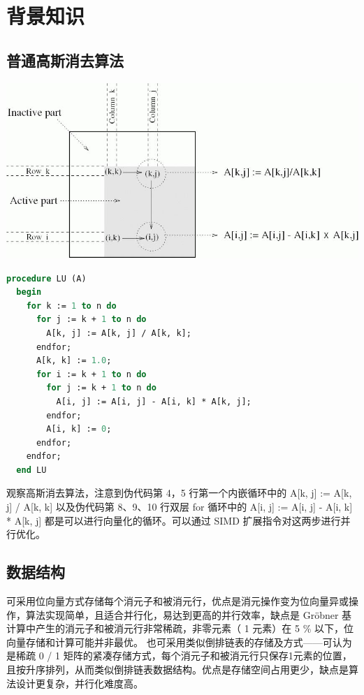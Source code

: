 \documentclass[a4paper]{article}
\begin{document}
\section{背景知识}

\subsection{普通高斯消去算法}

\includegraphics[width=\textwidth]{gauss-alg.jpg}

\begin{lstlisting}[title=普通高斯消去算法,frame=trbl,language={Pascal}]
  procedure LU (A)
  begin
    for k := 1 to n do
      for j := k + 1 to n do
        A[k, j] := A[k, j] / A[k, k];
      endfor;
      A[k, k] := 1.0;
      for i := k + 1 to n do
        for j := k + 1 to n do
          A[i, j] := A[i, j] - A[i, k] * A[k, j];
        endfor;
        A[i, k] := 0;
      endfor;
    endfor;
  end LU
\end{lstlisting}

观察高斯消去算法，注意到伪代码第 4，5 行第一个内嵌循环中的
A[k, j] := A[k, j] / A[k, k] 以及伪代码第 8、9、10 行双层 for 循环中的
A[i, j] := A[i, j] - A[i, k] * A[k, j] 都是可以进行向量化的循环。可以通过
SIMD 扩展指令对这两步进行并行优化。

\subsection{数据结构}

可采用位向量方式存储每个消元子和被消元行，优点是消元操作变为位向量异或操作，算法实现简单，且适合并行化，易达到更高的并行效率，缺点是 Gröbner 基计算中产生的消元子和被消元行非常稀疏，非零元素（ 1 元素）在 5 \% 以下，位向量存储和计算可能并非最优。
也可采用类似倒排链表的存储及方式——可认为是稀疏 0 / 1 矩阵的紧凑存储方式，每个消元子和被消元行只保存1元素的位置，且按升序排列，从而类似倒排链表数据结构。优点是存储空间占用更少，缺点是算法设计更复杂，并行化难度高。
\end{document}
